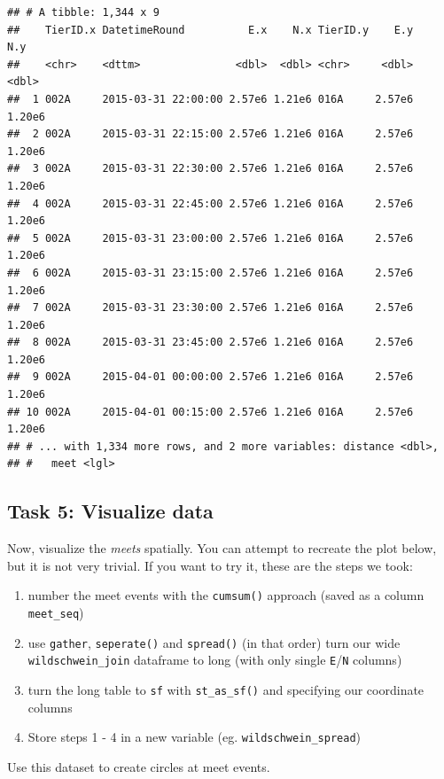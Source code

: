 \documentclass[]{book}
\providecommand{\tightlist}{%
  \setlength{\itemsep}{0pt}\setlength{\parskip}{0pt}}
\begin{document}
\begin{verbatim}
## # A tibble: 1,344 x 9
##    TierID.x DatetimeRound          E.x    N.x TierID.y    E.y    N.y
##    <chr>    <dttm>               <dbl>  <dbl> <chr>     <dbl>  <dbl>
##  1 002A     2015-03-31 22:00:00 2.57e6 1.21e6 016A     2.57e6 1.20e6
##  2 002A     2015-03-31 22:15:00 2.57e6 1.21e6 016A     2.57e6 1.20e6
##  3 002A     2015-03-31 22:30:00 2.57e6 1.21e6 016A     2.57e6 1.20e6
##  4 002A     2015-03-31 22:45:00 2.57e6 1.21e6 016A     2.57e6 1.20e6
##  5 002A     2015-03-31 23:00:00 2.57e6 1.21e6 016A     2.57e6 1.20e6
##  6 002A     2015-03-31 23:15:00 2.57e6 1.21e6 016A     2.57e6 1.20e6
##  7 002A     2015-03-31 23:30:00 2.57e6 1.21e6 016A     2.57e6 1.20e6
##  8 002A     2015-03-31 23:45:00 2.57e6 1.21e6 016A     2.57e6 1.20e6
##  9 002A     2015-04-01 00:00:00 2.57e6 1.21e6 016A     2.57e6 1.20e6
## 10 002A     2015-04-01 00:15:00 2.57e6 1.21e6 016A     2.57e6 1.20e6
## # ... with 1,334 more rows, and 2 more variables: distance <dbl>,
## #   meet <lgl>
\end{verbatim}

\subsection{Task 5: Visualize data}\label{task-5-visualize-data}

Now, visualize the \emph{meets} spatially. You can attempt to recreate
the plot below, but it is not very trivial. If you want to try it, these
are the steps we took:

\begin{enumerate}
\def\labelenumi{\arabic{enumi}.}
\tightlist
\item
  number the meet events with the \texttt{cumsum()} approach (saved as a
  column \texttt{meet\_seq})
\item
  use \texttt{gather}, \texttt{seperate()} and \texttt{spread()} (in
  that order) turn our wide \texttt{wildschwein\_join} dataframe to long
  (with only single \texttt{E}/\texttt{N} columns)
\item
  turn the long table to \texttt{sf} with \texttt{st\_as\_sf()} and
  specifying our coordinate columns
\item
  Store steps 1 - 4 in a new variable (eg. \texttt{wildschwein\_spread})
\end{enumerate}

Use this dataset to create circles at meet events.
\end{document}
